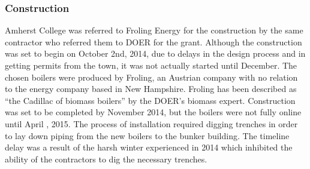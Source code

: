\subsubsection{Construction}
\par Amherst College was referred to Froling Energy for the construction by the same contractor who referred them to DOER for the grant. Although the construction was set to begin on October 2nd, 2014, due to delays in the design process and in getting permits from the town, it was not actually started until December. The chosen boilers were produced by Froling, an Austrian company with no relation to the energy company based in New Hampshire. Froling has been described as “the Cadillac of biomass boilers” by the DOER’s biomass expert. Construction was set to be completed by November  2014, but the boilers were not fully online until April , 2015. The process of installation required digging trenches in order to lay down piping from the new boilers to the bunker building. The timeline delay was a result of the harsh winter experienced in 2014 which inhibited the ability of the contractors to dig the necessary trenches.

